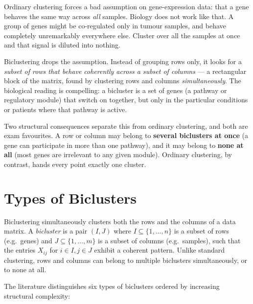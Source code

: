 \documentclass[11pt, oneside]{book}
\begin{document}
Ordinary clustering forces a bad assumption on gene-expression data: that a gene
behaves the same way across \emph{all} samples.
Biology does not work like that.
A group of genes might be co-regulated only in tumour samples, and behave
completely unremarkably everywhere else.
Cluster over all the samples at once and that signal is diluted into nothing.

Biclustering drops the assumption.
Instead of grouping rows only, it looks for a \emph{subset of rows that behave
coherently across a subset of columns} --- a rectangular block of the matrix,
found by clustering rows and columns \emph{simultaneously}.
The biological reading is compelling: a bicluster is a set of genes (a pathway or
regulatory module) that switch on together, but only in the particular conditions
or patients where that pathway is active.

Two structural consequences separate this from ordinary clustering, and both are
exam favourites.
A row or column may belong to \textbf{several biclusters at once} (a gene can
participate in more than one pathway), and it may belong to \textbf{none at all}
(most genes are irrelevant to any given module).
Ordinary clustering, by contrast, hands every point exactly one cluster.

\section{Types of Biclusters}

Biclustering simultaneously clusters both the rows and the columns of a data matrix.
A \emph{bicluster} is a pair $(I, J)$ where $I \subseteq \{1,\ldots,n\}$ is a subset of rows
(e.g.\ genes) and $J \subseteq \{1,\ldots,m\}$ is a subset of columns (e.g.\ samples),
such that the entries $X_{ij}$ for $i\in I, j\in J$ exhibit a coherent pattern.
Unlike standard clustering, rows and columns can belong to multiple biclusters simultaneously,
or to none at all.

The literature distinguishes six types of biclusters ordered by increasing structural complexity:
\end{document}
